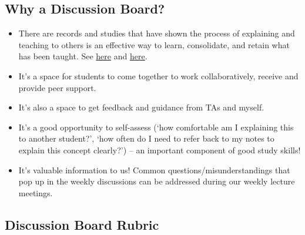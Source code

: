 \subsection*{Why a Discussion Board?}

\begin{itemize}
    \item There are records and studies that have shown the process of explaining and teaching to others is an effective way to learn, consolidate, and retain what has been taught. See \href{https://digest.bps.org.uk/2018/05/04/learning-by-teaching-others-is-extremely-effective-a-new-study-tested-a-key-reason-why/}{here} and \href{https://scholar.princeton.edu/sites/default/files/cognition/files/impairment_effect.pdf}{here}.
    \item It's a space for students to come together to work collaboratively, receive and provide peer support. 
    \item It's also a space to get feedback and guidance from TAs and myself. 
    \item It's a good opportunity to self-assess (`how comfortable am I explaining this to another student?', `how often do I need to refer back to my notes to explain this concept clearly?') -- an important component of good study skills! 
    \item It's valuable information to us! Common questions/misunderstandings that pop up in the weekly discussions can be addressed during our weekly lecture meetings.
\end{itemize}

\subsection*{Discussion Board Rubric}

